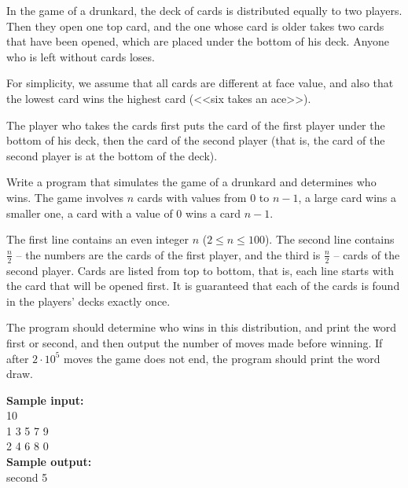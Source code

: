 \documentclass[a4paper]{article}
\begin{document}
In the game of a drunkard, the deck of cards is distributed equally to two players. Then they open one top card, and the one whose card is older takes two cards that have been opened, which are placed under the bottom of his deck. Anyone who is left without cards loses.

For simplicity, we assume that all cards are different at face value, and also that the lowest card wins the highest card (<<six takes an ace>>).

The player who takes the cards first puts the card of the first player under the bottom of his deck, then the card of the second player (that is, the card of the second player is at the bottom of the deck). 

Write a program that simulates the game of a drunkard and determines who wins. The game involves $n$ cards with values from $0$ to $n - 1$, a large card wins a smaller one, a card with a value of $0$ wins a card $n - 1$.

The first line contains an even integer $n$ ($2 \le n \le 100$). The second line contains $\frac{n}{2}$ -- the numbers are the cards of the first player, and the third is $\frac{n}{2}$ -- cards of the second player. Cards are listed from top to bottom, that is, each line starts with the card that will be opened first. It is guaranteed that each of the cards is found in the players' decks exactly once.

The program should determine who wins in this distribution, and print the word first or second, and then output the number of moves made before winning. If after $2 \cdot 10^5$ moves the game does not end, the program should print the word draw.

\LINE

\noindent \textbf{Sample input:}\\
10\\
1 3 5 7 9\\
2 4 6 8 0\\

\noindent \textbf{Sample output:}\\
second 5\\
\end{document}
